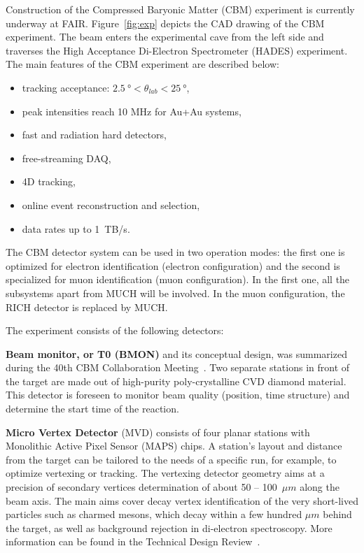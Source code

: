 Construction of the Compressed Baryonic Matter (\gls{CBM}) experiment is currently underway at \gls{FAIR}. Figure~\ref{fig:exp} depicts the CAD drawing of the \gls{CBM} experiment. The beam enters the experimental cave from the left side and traverses the High Acceptance Di-Electron Spectrometer (\gls{HADES}) experiment.  The main features of the \gls{CBM} experiment are described below:
\begin{itemize}
\item tracking acceptance: $\SI{2.5}{\degree} < \theta_{lab} < \SI{25}{\degree}$,
\item peak intensities reach 10 MHz for Au+Au systems,
\item fast and radiation hard detectors,
\item free-streaming \gls{DAQ},
\item 4D tracking,
\item online event reconstruction and selection,
\item data rates up to 1~TB/s.
\end{itemize}




The CBM detector system can be used in two operation modes: the first one is optimized for electron identification (electron configuration) and the second is specialized for muon identification (muon configuration). In the first one, all the subsystems apart from MUCH will be involved. In the muon configuration, the \gls{RICH} detector is replaced by \gls{MUCH}.



The experiment consists of the following detectors:

\textbf{Beam monitor, or T0 (\gls{BMON})} and its conceptual design, was summarized during the 40th \gls{CBM} Collaboration Meeting~\cite{bmon}. Two separate stations in front of the target are made out of high-purity poly-crystalline CVD diamond material. This detector is foreseen to monitor beam quality (position, time structure) and determine the start time of the reaction.

\textbf{Micro Vertex Detector} (\gls{MVD}) consists of four planar stations with Monolithic Active Pixel Sensor (\gls{MAPS}) chips. A station's layout and distance from the target can be tailored to the needs of a specific run, for example, to optimize vertexing or tracking. The vertexing detector geometry aims at a precision of secondary vertices determination of about 50 -- 100~$\mu m$ along the beam axis. The main aims cover decay vertex identification of the very short-lived particles such as charmed mesons, which decay within a few hundred $\mu m$ behind the target, as well as background rejection in di-electron spectroscopy. More information can be found in the Technical Design Review~\cite{MVD}.

